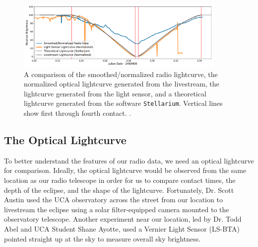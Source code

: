 \begin{figure}[h]
    \includegraphics[width=0.9\textwidth]{figures/LightcurveComparison.pdf}
    \caption{\label{fig:LightcurveComparison} A comparison of the smoothed/normalized radio lightcurve, the normalized optical lightcurve generated from the livestream, the lightcurve generated from the light sensor, and a theoretical lightcurve generated from the software \texttt{Stellarium}. Vertical lines show first through fourth contact. \protect.}
\end{figure}



\subsection{\label{sec:optical}The Optical Lightcurve}

To better understand the features of our radio data, we need an optical lightcurve for comparison.
Ideally, the optical lightcurve would be observed from the same location as our radio telescope in order for us to compare contact times, the depth of the eclipse, and the shape of the lightcurve.
Fortunately, Dr. Scott Austin used the UCA observatory across the street from our location to livestream the eclipse using a solar filter-equipped camera mounted to the observatory telescope.
Another experiment near our location, led by Dr. Todd Abel and UCA Student Shane Ayotte, used a Vernier Light Sensor (LS-BTA) pointed straight up at the sky to measure overall sky brightness.
